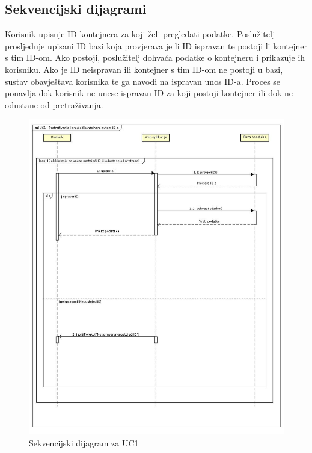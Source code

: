             \clearpage
            
			\eject		

			\subsection{Sekvencijski dijagrami}
			
			
			\noindent Korisnik upisuje ID kontejnera za koji želi pregledati podatke. Poslužitelj prosljeđuje upisani ID bazi koja provjerava je li ID ispravan te postoji li kontejner s tim ID-om. Ako postoji, poslužitelj dohvaća podatke o kontejneru i prikazuje ih korisniku. Ako je ID neispravan ili kontejner s tim ID-om ne postoji u bazi, sustav obavještava korisnika te ga navodi na ispravan unos ID-a. Proces se ponavlja dok korisnik ne unese ispravan ID za koji postoji kontejner ili dok ne odustane od pretraživanja.
			
			
			\eject
			
			\begin{figure}
				\centering
				\includegraphics[width=1.0\linewidth]{"slike/UC1-seq"}
				\caption{Sekvencijski dijagram za UC1}
				\label{fig:UC1-Seq}
			\end{figure}
			
